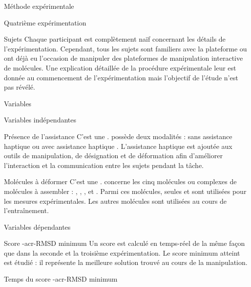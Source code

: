 \documentclass[myfrancais,ngerman,english,french]{mythesis}
\begin{document}
\begin{mychapter}{Méthode expérimentale}
\begin{mysection}{Quatrième expérimentation}
\begin{mysubsection}{Sujets}
				Chaque participant est complètement naïf concernant les détails de l'expérimentation.
				Cependant, tous les sujets sont familiers avec la plateforme \myShaddock ou ont déjà eu l'occasion de manipuler des plateformes de manipulation interactive de molécules.
				Une explication détaillée de la procédure expérimentale leur est donnée au commencement de l'expérimentation mais l'objectif de l'étude n'est pas révélé.
			\end{mysubsection}
			\begin{mysubsection}{Variables}
				\begin{mysubsubsection}{Variables indépendantes}
					\begin{myparagraph}{ Présence de l'assistance}
						C'est une .
						 possède deux modalités : \og sans assistance haptique \fg ou \og avec assistance haptique \fg.
						L'assistance haptique est ajoutée aux outils de manipulation, de désignation et de déformation afin d'améliorer l'interaction et la communication entre les sujets pendant la tâche.
					\end{myparagraph}
					\begin{myparagraph}{ Molécules à déformer}
						C'est une \myglos{glo-VariableIntraSujets}.
						 concerne les cinq molécules ou complexes de molécules à assembler : \og \myTRPCAGE \fg, \og \myPrion \fg, \og \myUbiquitin \fg, \og \myTRPZIPPER \fg et \og \myNusENusG \fg.
						Parmi ces molécules, seules \myUbiquitin et \myNusENusG sont utilisées pour les mesures expérimentales.
						Les autres molécules sont utilisées au cours de l'entraînement.
					\end{myparagraph}
				\end{mysubsubsection}
				\begin{mysubsubsection}{Variables dépendantes}
					\begin{myparagraph}{ Score \myacronl-{acr-RMSD} minimum}
						Un score  est calculé en temps-réel de la même façon que dans la seconde et la troisième expérimentation.
						Le score minimum atteint est étudié : il représente la meilleure solution trouvé au cours de la manipulation.
					\end{myparagraph}
					\begin{myparagraph}{ Temps du score \myacronl-{acr-RMSD} minimum}

\end{myparagraph}
\end{mysubsubsection}
\end{mysubsection}
\end{mysection}
\end{mychapter}
\end{document}
